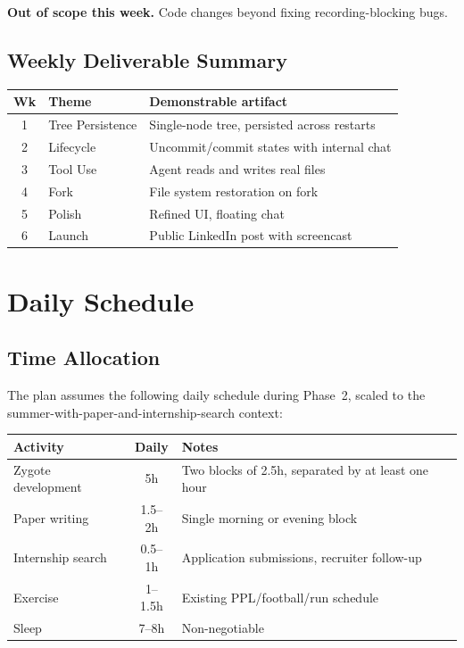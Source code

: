 \documentclass[11pt,letterpaper]{article}
\begin{document}
\textbf{Out of scope this week.} Code changes beyond fixing recording-blocking bugs.

\subsection*{Weekly Deliverable Summary}

\begin{tabularx}{\textwidth}{@{}clX@{}}
\toprule
\textbf{Wk} & \textbf{Theme} & \textbf{Demonstrable artifact} \\
\midrule
1 & Tree Persistence & Single-node tree, persisted across restarts \\
2 & Lifecycle & Uncommit/commit states with internal chat \\
3 & Tool Use & Agent reads and writes real files \\
4 & Fork & File system restoration on fork \\
5 & Polish & Refined UI, floating chat \\
6 & Launch & Public LinkedIn post with screencast \\
\bottomrule
\end{tabularx}

\section{Daily Schedule}
\label{sec:daily}

\subsection*{Time Allocation}

The plan assumes the following daily schedule during Phase~2, scaled to the summer-with-paper-and-internship-search context:

\begin{tabularx}{\textwidth}{@{}lcX@{}}
\toprule
\textbf{Activity} & \textbf{Daily} & \textbf{Notes} \\
\midrule
Zygote development & 5h & Two blocks of 2.5h, separated by at least one hour \\
Paper writing & 1.5--2h & Single morning or evening block \\
Internship search & 0.5--1h & Application submissions, recruiter follow-up \\
Exercise & 1--1.5h & Existing PPL/football/run schedule \\
Sleep & 7--8h & Non-negotiable \\
\bottomrule
\end{tabularx}
\end{document}
